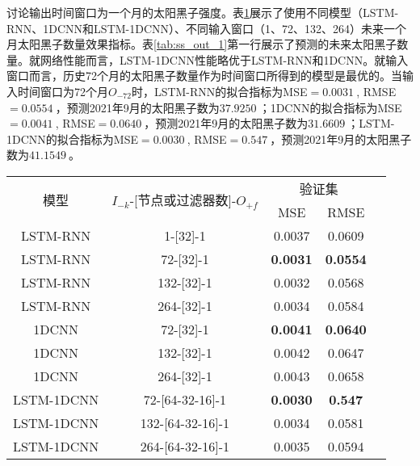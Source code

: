 讨论输出时间窗口为一个月的太阳黑子强度。表\ref{tab:ss_number_out_1}展示了使用不同模型（LSTM-RNN、1DCNN和LSTM-1DCNN）、不同输入窗口（1、72、132、264）未来一个月太阳黑子数量效果指标。表\ref{tab:ss_out_1}第一行展示了预测的未来太阳黑子数量。就网络性能而言，LSTM-1DCNN性能略优于LSTM-RNN和1DCNN。就输入窗口而言，历史72个月的太阳黑子数量作为时间窗口所得到的模型是最优的。当输入时间窗口为72个月$O_{-72}$时，LSTM-RNN的拟合指标为MSE$=\SI{0.0031}{}$, RMSE$=\SI{0.0554}{}$，预测2021年9月的太阳黑子数为$\SI{37.9250}{}$；1DCNN的拟合指标为MSE$=\SI{0.0041}{}$, RMSE$=\SI{0.0640}{}$，预测2021年9月的太阳黑子数为$\SI{31.6609}{}$；LSTM-1DCNN的拟合指标为MSE$=\SI{0.0030}{}$, RMSE$=\SI{0.547}{}$，预测2021年9月的太阳黑子数为$\SI{41.1549}{}$。

\begin{table}[!htbp]
  \centering
  \label{tab:ss_number_out_1}
  \footnotesize
  \renewcommand{\arraystretch}{1}
  \begin{tabular}{ccccc}
    \toprule
    \multirow{2}{*}{模型} & \multirow{2}{*}{$I_{-k}$-[节点或过滤器数]-$O_{+f}$} & \multicolumn{2}{c}{验证集}\\
    \cmidrule(lr){3-4}
    \noalign{\smallskip}
    & & MSE & RMSE\\
    \midrule 
    LSTM-RNN & 1-[32]-1 & 0.0037 & 0.0609 \\
    LSTM-RNN & 72-[32]-1 & \textbf{0.0031} & \textbf{0.0554} \\
    LSTM-RNN & 132-[32]-1 & 0.0032 & 0.0568 \\
    LSTM-RNN & 264-[32]-1 & 0.0034 & 0.0584 \\
    \hline
    1DCNN & 72-[32]-1 & \textbf{0.0041} & \textbf{0.0640} \\
    1DCNN & 132-[32]-1 & 0.0042 & 0.0647 \\
    1DCNN & 264-[32]-1 & 0.0043 & 0.0658 \\
    \hline
    LSTM-1DCNN & 72-[64-32-16]-1 & \textbf{0.0030} & \textbf{0.547} \\
    LSTM-1DCNN & 132-[64-32-16]-1 & 0.0034 & 0.0581 \\
    LSTM-1DCNN & 264-[64-32-16]-1 & 0.0035 & 0.0594 \\
    \bottomrule
  \end{tabular}
\end{table}

